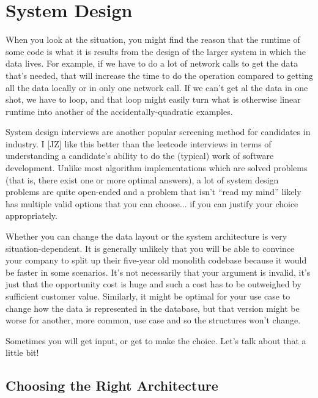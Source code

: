 




\section*{System Design}
When you look at the situation, you might find the reason that the runtime of some code is what it is results from the design of the larger system in which the data lives. For example, if we have to do a lot of network calls to get the data that's needed, that will increase the time to do the operation compared to getting all the data locally or in only one network call. If we can't get al the data in one shot, we have to loop, and that loop might easily turn what is otherwise linear runtime into another of the accidentally-quadratic examples.

System design interviews are another popular screening method for candidates in industry. I [JZ] like this better than the leetcode interviews in terms of understanding a candidate's ability to do the (typical) work of software development. Unlike most algorithm implementations which are solved problems (that is, there exist one or more optimal answers), a lot of system design problems are quite open-ended and a problem that isn't ``read my mind'' likely has multiple valid options that you can choose... if you can justify your choice appropriately. 

Whether you can change the data layout or the system architecture is very situation-dependent. It is generally unlikely that you will be able to convince your company to split up their five-year old monolith codebase because it would be faster in some scenarios. It's not necessarily that your argument is invalid, it's just that the opportunity cost is huge and such a cost has to be outweighed by sufficient customer value. Similarly, it might be optimal for your use case to change how the data is represented in the database, but that version might be worse for another, more common, use case and so the structures won't change. 

Sometimes you will get input, or get to make the choice. Let's talk about that a little bit!

\subsection*{Choosing the Right Architecture}



